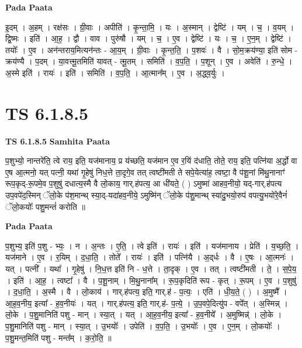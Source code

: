 \documentclass[17pt]{extarticle}
\begin{document}
\textbf{Pada Paata} \newline

इ॒दम् । अ॒हम् । रक्ष॑सः । ग्री॒वाः । अपीति॑ । कृ॒न्ता॒मि॒ । यः । अ॒स्मान् । द्वेष्टि॑ । यम् । च॒ । व॒यम् । द्वि॒ष्मः । इति॑ । आ॒ह॒ । द्वौ । वाव । पुरु॑षौ । यम् । च॒ । ए॒व । द्वेष्टि॑ । यः । च॒ । ए॒न॒म् । द्वेष्टि॑ । तयोः᳚ । ए॒व । अन॑न्तराय॒मित्यन॑न्तः - आ॒य॒म् । ग्री॒वाः । कृ॒न्त॒ति॒ । प॒शवः॑ । वै । सो॒म॒क्रय॑ण्या॒ इति॑ सोम - क्रय॑ण्यै । प॒दम् । या॒वत्त्मू॒तमिति॑ यावत् - त्मू॒तम् । समिति॑ । व॒प॒ति॒ । प॒शून् । ए॒व । अवेति॑ । रु॒न्धे॒ । अ॒स्मे इति॑ । रायः॑ । इति॑ । समिति॑ । व॒प॒ति॒ । आ॒त्मान᳚म् । ए॒व । अ॒द्ध्व॒र्युः ।  \newline





\section{ TS 6.1.8.5 }

\textbf{TS 6.1.8.5 } \newline
\textbf{Samhita Paata} \newline

प॒शुभ्यो॒ नान्तरे॑ति॒ त्वे राय॒ इति॒ यज॑मानाय॒ प्र य॑च्छति॒ यज॑मान ए॒व र॒यिं द॑धाति॒ तोते॒ राय॒ इति॒ पत्नि॑या अ॒र्द्धो वा ए॒ष आ॒त्मनो॒ यत् पत्नी॒ यथा॑ गृ॒हेषु॑ निध॒त्ते ता॒दृगे॒व तत् त्वष्टी॑मती ते सपे॒येत्या॑ह॒ त्वष्टा॒ वै प॑शू॒नां मि॑थु॒नानाꣳ॑ रूप॒कृद्-रू॒पमे॒व प॒शुषु॑ दधात्य॒स्मै वै लो॒काय॒ गार्.ह॑पत्य॒ आ धी॑यते॒ ( ) ऽमुष्मा॑ आहव॒नीयो॒ यद्-गार्.ह॑पत्य उप॒वपे॑द॒स्मिन् ॅलो॒के प॑श॒मान्थ् स्या॒द्-यदा॑हव॒नीये॒ ऽमुष्मि॑न् ॅलो॒के प॑शु॒मान्थ् स्या॑दु॒भयो॒रुप॑ वपत्यु॒भयो॑रे॒वैनं॑ ॅलो॒कयोः᳚ पशु॒मन्तं॑ करोति ॥ \newline

\textbf{Pada Paata} \newline

प॒शुभ्य॒ इति॑ प॒शु - भ्यः॒ । न । अ॒न्तः । ए॒ति॒ । त्वे इति॑ । रायः॑ । इति॑ । यज॑मानाय । प्रेति॑ । य॒च्छ॒ति॒ । यज॑माने । ए॒व । र॒यिम् । द॒धा॒ति॒ । तोते᳚ । रायः॑ । इति॑ । पत्नि॑यै । अ॒द्‌र्धः । वै । ए॒षः । आ॒त्मनः॑ । यत् । पत्नी᳚ । यथा᳚ । गृ॒हेषु॑ । नि॒ध॒त्त इति॑ नि - ध॒त्ते । ता॒दृक् । ए॒व । तत् । त्वष्टी॑मती । ते॒ । स॒पे॒य॒ । इति॑ । आ॒ह॒ । त्वष्टा᳚ । वै । प॒शू॒नाम् । मि॒थु॒नाना᳚म् । रू॒प॒कृदिति॑ रूप - कृत् । रू॒पम् । ए॒व । प॒शुषु॑ । द॒धा॒ति॒ । अ॒स्मै । वै । लो॒काय॑ । गार्.ह॑पत्य॒ इति॒ गार्.ह॑ - प॒त्यः॒ । एति॑ । धी॒य॒ते॒ ( ) । अ॒मुष्मै᳚ । आ॒ह॒व॒नीय॒ इत्या᳚ - ह॒व॒नीयः॑ । यत् । गार्.ह॑पत्य॒ इति॒ गार्.ह॑- प॒त्ये॒ । उ॒प॒वपे॒दित्यु॑प - वपे᳚त् । अ॒स्मिन्न् । लो॒के । प॒शु॒मानिति॑ पशु - मान् । स्या॒त् । यत् । आ॒ह॒व॒नीय॒ इत्या᳚ - ह॒व॒नीये᳚ । अ॒मुष्मिन्न्॑ । लो॒के । प॒शु॒मानिति॑ पशु - मान् । स्या॒त् । उ॒भयोः᳚ । उपेति॑ । व॒प॒ति॒ । उ॒भयोः᳚ । ए॒व । ए॒न॒म् । लो॒कयोः᳚ । प॒शु॒मन्त॒मिति॑ पशु - मन्त᳚म् । क॒रो॒ति॒ ॥  \newline
\end{document}
